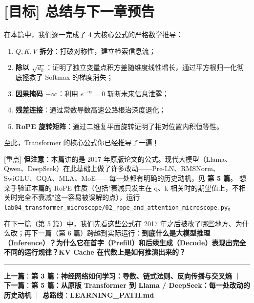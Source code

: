 \section{[目标] 总结与下一章预告}

在本篇中，我们逐一完成了 4 大核心公式的严格数学推导：
\begin{enumerate}
  \item \textbf{$Q, K, V$ 拆分}：打破对称性，建立检索信息流；
  \item \textbf{除以 $\sqrt{d_k}$}：证明了独立变量点积方差随维度线性增长，通过平方根归一化彻底拯救了 Softmax 的梯度消失；
  \item \textbf{因果掩码 $-\infty$}：利用 $e^{-\infty}=0$ 斩断未来信息泄露；
  \item \textbf{残差连接}：通过常数导数高速公路根治深度退化；
  \item \textbf{RoPE 旋转矩阵}：通过二维复平面旋转证明了相对位置内积恒等性。
\end{enumerate}

至此，Transformer 的核心公式你已经推导了一遍！

\begin{tipBox}[核心直觉与思考]
{}[重点] \textbf{但注意}：本篇讲的是 2017 年原版论文的公式。现代大模型（Llama、Qwen、DeepSeek）在此基础上做了许多改动——Pre-LN、RMSNorm、SwiGLU、GQA、MLA、MoE——每一处都有明确的历史动机，见 \textbf{第 5 篇}。
想亲手验证本篇的 RoPE 性质（包括"衰减只发生在 q、k 相关时的期望值上，不相关时完全不衰减"这一容易被误解的点），运行 \texttt{lab04\_transformer\_microscope/02\_rope\_and\_attention\_microscope.py}。
\end{tipBox}

在下一篇（第 5 篇）中，我们先看这些公式在 2017 年之后被改了哪些地方、为什么改；再下一篇（第 6 篇）跨越到实际运行：\textbf{到底什么是大模型推理（Inference）？为什么它在首字（Prefill）和后续生成（Decode）表现出完全不同的运行规律？KV Cache 在代数上是如何推演出来的？}

\vspace{0.8em}\hrule\vspace{0.8em}

\textbf{上一篇}：\textbf{第 3 篇：神经网络如何学习：导数、链式法则、反向传播与交叉熵} ｜ \textbf{下一篇}：\textbf{第 5 篇：从原版 Transformer 到 Llama / DeepSeek：每一处改动的历史动机} ｜ \textbf{总路线}：\textbf{LEARNING\_PATH.md}
